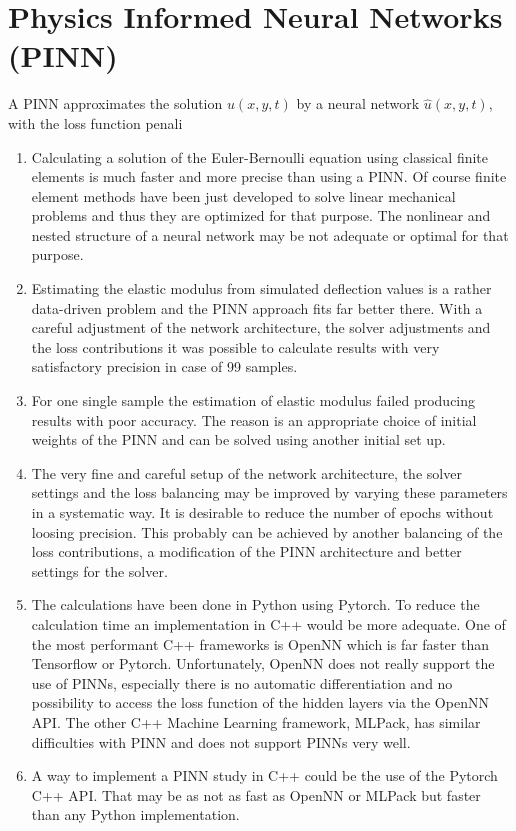 \documentclass[a4paper,11pt]{article}
\begin{document}
\section{Physics Informed Neural Networks (PINN)}
A PINN approximates the solution $u(x,y,t)$ by a neural network $\hat{u}(x,y,t)$, with the loss function penali
\begin{enumerate}
\item
Calculating a solution of the Euler-Bernoulli equation using classical finite elements is much faster and more precise than using a PINN. Of course finite element methods have been just developed to solve linear mechanical problems and thus they are optimized for that purpose. The nonlinear and nested structure of  a neural network may be not adequate or optimal for that purpose.
\item
Estimating the elastic modulus from simulated deflection values is a rather data-driven problem and the PINN approach fits far better there. With a careful adjustment of the network architecture, the solver adjustments and the loss contributions it was possible to calculate results with very satisfactory precision in case of 99 samples.
\item
For one single sample the estimation of elastic modulus failed producing results with poor accuracy. The reason is an appropriate choice of initial weights of the PINN and can be solved using another initial set up.
\item
The very fine and careful setup of the network architecture, the solver settings and the loss balancing may be improved by varying these parameters in a systematic way. It is desirable to reduce the number of epochs without loosing precision. This probably can be achieved by another balancing of the loss contributions, a modification of the PINN architecture and better settings for the solver.
\item
The calculations have been done in Python using Pytorch. To reduce the calculation time an implementation in C++ would be more adequate. One of the most performant  C++ frameworks is OpenNN which is far faster than Tensorflow or Pytorch. Unfortunately, OpenNN does not really support the use of PINNs, especially there is no automatic differentiation and no possibility to access the loss function of the hidden layers via the OpenNN API. The other C++ Machine Learning framework, MLPack, has similar difficulties with PINN and does not support PINNs very well.
\item
A way to implement a PINN study in C++ could be the use of the Pytorch C++ API. That may be as not as fast as OpenNN or MLPack but faster than any Python implementation.
\end{enumerate}
\end{document}
